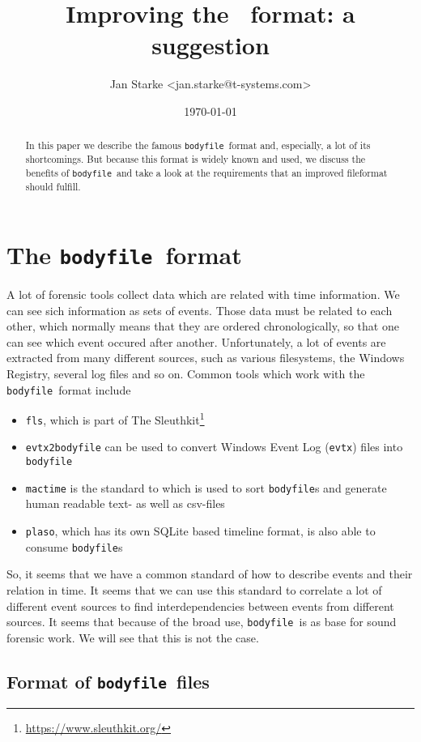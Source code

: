 \documentclass[twocolumn]{article}
\title{Improving the \bodyfile\ format: a suggestion}
\author{Jan Starke <jan.starke@t-systems.com>}
\date{\today}
\newcommand{\bodyfile}{\texttt{bodyfile}}
\begin{document}
\maketitle

\begin{abstract}
    In this paper we describe the famous \bodyfile\ format and, especially, a lot of its shortcomings. But because this format is widely known and used, we discuss the benefits of \bodyfile\ and take a look at the requirements that an improved fileformat should fulfill.
\end{abstract}

\section{The \bodyfile\ format}

A lot of forensic tools collect data which are related with time information. We can see sich information as sets of events. Those data must be related to each other, which normally means that they are ordered chronologically, so that one can see which event occured after another. Unfortunately, a lot of events are extracted from many different sources, such as various filesystems, the Windows Registry, several log files and so on. Common tools which work with the \bodyfile\ format include

\begin{itemize}
    \item \texttt{fls}, which is part of The Sleuthkit\footnote{\url{https://www.sleuthkit.org/}}
    \item \texttt{evtx2bodyfile} can be used to convert Windows Event Log (\texttt{evtx}) files into \bodyfile
    \item \texttt{mactime} is the standard to which is used to sort \bodyfile s and generate human readable text- as well as csv-files
    \item \texttt{plaso}, which has its own SQLite based timeline format, is also able to consume \bodyfile s
\end{itemize}

So, it seems that we have a common standard of how to describe events and their relation in time. It seems that we can use this standard to correlate a lot of different event sources to find interdependencies between events from different sources. It seems that because of the broad use, \bodyfile\ is as base for sound forensic work. We will see that this is not the case.

\subsection{Format of \bodyfile\ files}
\end{document}
